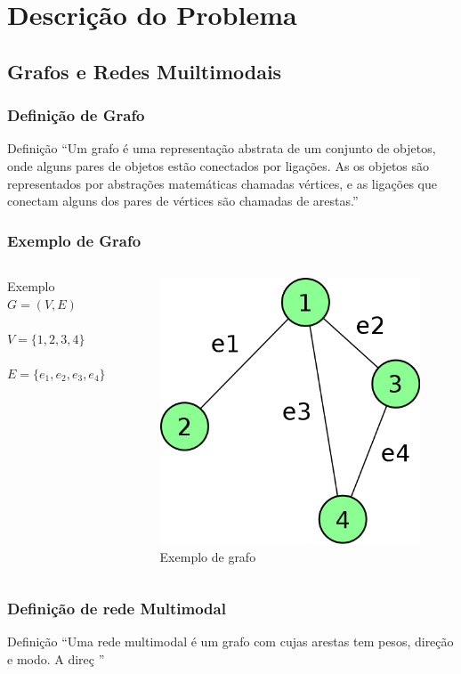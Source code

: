 \section{Descrição do Problema}

\subsection{Grafos e Redes Muiltimodais}

\frame
{
\frametitle{Definição de Grafo}
\begin{block}{Definição}
``Um grafo é uma representação abstrata de um conjunto de objetos, onde alguns pares de objetos estão conectados por ligações.
As os objetos são representados por abstrações matemáticas chamadas vértices, e as ligações que conectam alguns dos pares de vértices são chamadas de arestas.''
\end{block}
}

\frame
{
\frametitle{Exemplo de Grafo}
\begin{columns}[c]
\column{1.5in}
	\begin{exampleblock}{Exemplo}
		$G = (V,E)$ \\
		$ $ \\
		$V = \{1,2,3,4\}$ \\
		$ $ \\
		$E = \{e_1,e_2,e_3,e_4\}$ 
	\end{exampleblock}
\column{1.5in}
	\begin{figure}
		\includegraphics[width=\textwidth]{./imgs/grafo.png}
		\caption{Exemplo de grafo}
	\end{figure}
\end{columns}
}

\frame
{
\frametitle{Definição de rede Multimodal}
\begin{block}{Definição}
``Uma rede multimodal é um grafo com cujas arestas tem pesos, direção e modo. A direç
''
\end{block}
}
